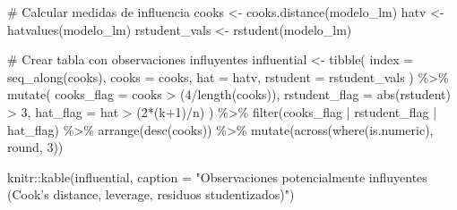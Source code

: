 \documentclass[
  spanish,
  11pt,
  a4paper,
  DIV=11,
  numbers=noendperiod]{scrartcl}
\newenvironment{Shaded}{\begin{snugshade}}{\end{snugshade}}
\newcommand{\AttributeTok}[1]{\textcolor[rgb]{0.40,0.45,0.13}{#1}}
\newcommand{\CommentTok}[1]{\textcolor[rgb]{0.37,0.37,0.37}{#1}}
\newcommand{\DecValTok}[1]{\textcolor[rgb]{0.68,0.00,0.00}{#1}}
\newcommand{\FunctionTok}[1]{\textcolor[rgb]{0.28,0.35,0.67}{#1}}
\newcommand{\NormalTok}[1]{\textcolor[rgb]{0.00,0.23,0.31}{#1}}
\newcommand{\OtherTok}[1]{\textcolor[rgb]{0.00,0.23,0.31}{#1}}
\newcommand{\SpecialCharTok}[1]{\textcolor[rgb]{0.37,0.37,0.37}{#1}}
\newcommand{\StringTok}[1]{\textcolor[rgb]{0.13,0.47,0.30}{#1}}
\begin{document}
\begin{Shaded}
\begin{Highlighting}[numbers=left,,]
\CommentTok{\# Calcular medidas de influencia}
\NormalTok{cooks }\OtherTok{\textless{}{-}} \FunctionTok{cooks.distance}\NormalTok{(modelo\_lm)}
\NormalTok{hatv  }\OtherTok{\textless{}{-}} \FunctionTok{hatvalues}\NormalTok{(modelo\_lm)}
\NormalTok{rstudent\_vals }\OtherTok{\textless{}{-}} \FunctionTok{rstudent}\NormalTok{(modelo\_lm)}

\CommentTok{\# Crear tabla con observaciones influyentes}
\NormalTok{influential }\OtherTok{\textless{}{-}} \FunctionTok{tibble}\NormalTok{(}
  \AttributeTok{index =} \FunctionTok{seq\_along}\NormalTok{(cooks),}
  \AttributeTok{cooks =}\NormalTok{ cooks,}
  \AttributeTok{hat =}\NormalTok{ hatv,}
  \AttributeTok{rstudent =}\NormalTok{ rstudent\_vals}
\NormalTok{) }\SpecialCharTok{\%\textgreater{}\%}
  \FunctionTok{mutate}\NormalTok{(}
    \AttributeTok{cooks\_flag =}\NormalTok{ cooks }\SpecialCharTok{\textgreater{}}\NormalTok{ (}\DecValTok{4}\SpecialCharTok{/}\FunctionTok{length}\NormalTok{(cooks)),}
    \AttributeTok{rstudent\_flag =} \FunctionTok{abs}\NormalTok{(rstudent) }\SpecialCharTok{\textgreater{}} \DecValTok{3}\NormalTok{,}
    \AttributeTok{hat\_flag =}\NormalTok{ hat }\SpecialCharTok{\textgreater{}}\NormalTok{ (}\DecValTok{2}\SpecialCharTok{*}\NormalTok{(k}\SpecialCharTok{+}\DecValTok{1}\NormalTok{)}\SpecialCharTok{/}\NormalTok{n)}
\NormalTok{  ) }\SpecialCharTok{\%\textgreater{}\%}
  \FunctionTok{filter}\NormalTok{(cooks\_flag }\SpecialCharTok{|}\NormalTok{ rstudent\_flag }\SpecialCharTok{|}\NormalTok{ hat\_flag) }\SpecialCharTok{\%\textgreater{}\%}
  \FunctionTok{arrange}\NormalTok{(}\FunctionTok{desc}\NormalTok{(cooks)) }\SpecialCharTok{\%\textgreater{}\%}
  \FunctionTok{mutate}\NormalTok{(}\FunctionTok{across}\NormalTok{(}\FunctionTok{where}\NormalTok{(is.numeric), round, }\DecValTok{3}\NormalTok{))}

\NormalTok{knitr}\SpecialCharTok{::}\FunctionTok{kable}\NormalTok{(influential, }\AttributeTok{caption =} \StringTok{"Observaciones potencialmente }
\StringTok{             influyentes (Cook’s distance, leverage, residuos studentizados)"}\NormalTok{)}
\end{Highlighting}
\end{Shaded}
\end{document}
